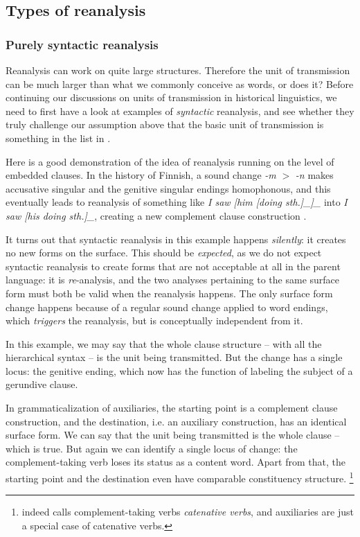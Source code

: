 \documentclass[a4paper, oneside, scheme=plain, 12pt]{article}
\newcommand*{\citepage}[1]{p.~{#1}}
\newcommand*{\citepages}[1]{pp.~{#1}}
\newcommand*{\term}[1]{\emph{#1}}
\newcommand{\form}[1]{\emph{#1}}
\newcommand*{\textgt}{$>$ }
\begin{document}
\subsection{Types of reanalysis}\label{sec:reanalysis}

\subsubsection{Purely syntactic reanalysis}\label{sec:syntactic-reanalysis}

Reanalysis can work on quite large structures.
Therefore the unit of transmission can be much larger than what we commonly conceive as words, or does it?
Before continuing our discussions on units of transmission in historical linguistics,
we need to first have a look at examples of \emph{syntactic} reanalysis,
and see whether they truly challenge our assumption above that
the basic unit of transmission is something in the list in .

Here is a good demonstration of the idea of reanalysis running on the level of embedded clauses.
In the history of Finnish, a sound change \form{-m} \textgt \form{-n} makes accusative singular and the genitive singular endings homophonous,
and this eventually leads to reanalysis of something like \form{I saw [him [doing sth.]_{}]_{\text{object: noun phrase}}} into 
\form{I saw [his doing sth.]_{}},
creating a new complement clause construction
\citep[\citepages{275-276}]{campbell2013historical}.

It turns out that syntactic reanalysis in this example happens \emph{silently}:
it creates no new forms on the surface. 
This should be \emph{expected}, as we do not expect syntactic reanalysis to create forms 
that are not acceptable at all in the parent language:
it is \emph{re}-analysis, and the two analyses pertaining to the same surface form
must both be valid when the reanalysis happens.
The only surface form change happens because of a regular sound change applied to word endings,
which \emph{triggers} the reanalysis, but is conceptually independent from it.

In this example, we may say that the whole clause structure -- with all the hierarchical syntax -- is the unit being transmitted.
But the change has a single locus: the genitive ending,
which now has the function of labeling the subject of a gerundive clause.

In grammaticalization of auxiliaries,
the starting point is a complement clause construction,
and the destination, i.e. an auxiliary construction, has an identical surface form.
We can say that the unit being transmitted is the whole clause -- which is true.
But again we can identify a single locus of change:
the complement-taking verb loses its status as a content word.
Apart from that, the starting point and the destination even have comparable constituency structure.%
\footnote{
    \citet[\citepage{65}]{cgel} indeed calls complement-taking verbs \term{catenative verbs},
    and auxiliaries are just a special case of catenative verbs.
}
\end{document}
